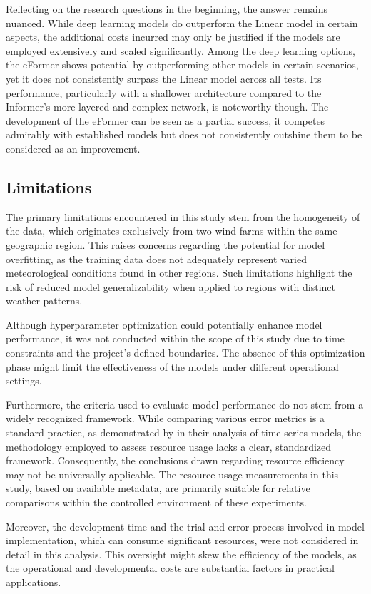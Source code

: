 \documentclass{article}
\begin{document}
Reflecting on the research questions in the beginning, the answer remains nuanced. While deep learning models do outperform the Linear model in certain aspects, the additional costs incurred may only be justified if the models are employed extensively and scaled significantly. Among the deep learning options, the eFormer shows potential by outperforming other models in certain scenarios, yet it does not consistently surpass the Linear model across all tests. Its performance, particularly with a shallower architecture compared to the Informer's more layered and complex network, is noteworthy though. The development of the eFormer can be seen as a partial success, it competes admirably with established models but does not consistently outshine them to be considered as an improvement.


\subsection{Limitations}

The primary limitations encountered in this study stem from the homogeneity of the data, which originates exclusively from two wind farms within the same geographic region. This raises concerns regarding the potential for model overfitting, as the training data does not adequately represent varied meteorological conditions found in other regions. Such limitations highlight the risk of reduced model generalizability when applied to regions with distinct weather patterns.

Although hyperparameter optimization could potentially enhance model performance, it was not conducted within the scope of this study due to time constraints and the project's defined boundaries. The absence of this optimization phase might limit the effectiveness of the models under different operational settings.

Furthermore, the criteria used to evaluate model performance do not stem from a widely recognized framework. While comparing various error metrics is a standard practice, as demonstrated by \cite{TS-ranking} in their analysis of time series models, the methodology employed to assess resource usage lacks a clear, standardized framework. Consequently, the conclusions drawn regarding resource efficiency may not be universally applicable. The resource usage measurements in this study, based on available metadata, are primarily suitable for relative comparisons within the controlled environment of these experiments.

Moreover, the development time and the trial-and-error process involved in model implementation, which can consume significant resources, were not considered in detail in this analysis. This oversight might skew the efficiency of the models, as the operational and developmental costs are substantial factors in practical applications.
\end{document}
